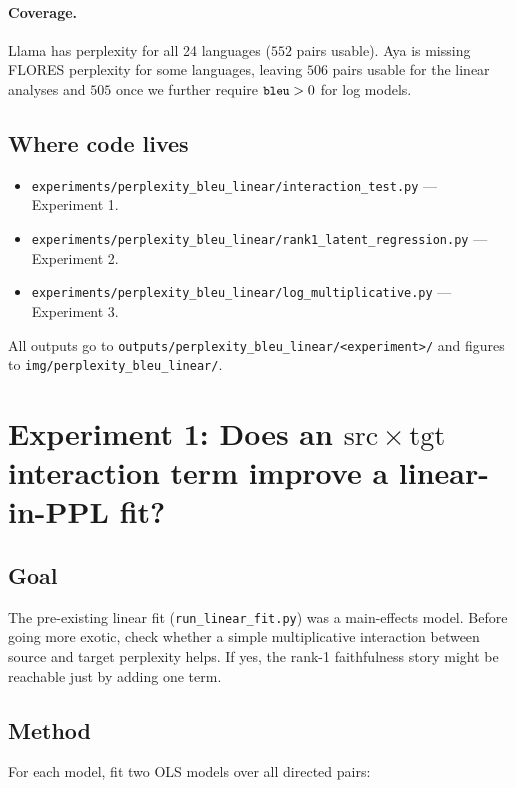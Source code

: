 \documentclass[11pt]{article}
\newcommand{\code}[1]{\texttt{\small #1}}
\begin{document}
\paragraph{Coverage.} Llama has perplexity for all 24 languages
($552$ pairs usable). Aya is missing FLORES perplexity for some languages,
leaving $506$ pairs usable for the linear analyses and $505$ once we further
require $\code{bleu} > 0$ for log models.

\subsection{Where code lives}

\begin{itemize}
  \item \code{experiments/perplexity\_bleu\_linear/interaction\_test.py} ---
    Experiment 1.
  \item \code{experiments/perplexity\_bleu\_linear/rank1\_latent\_regression.py} ---
    Experiment 2.
  \item \code{experiments/perplexity\_bleu\_linear/log\_multiplicative.py} ---
    Experiment 3.
\end{itemize}

All outputs go to \code{outputs/perplexity\_bleu\_linear/<experiment>/} and
figures to \code{img/perplexity\_bleu\_linear/}.

\section{Experiment 1: Does an $\mathrm{src} \times \mathrm{tgt}$ interaction term improve a linear-in-PPL fit?}

\subsection{Goal}

The pre-existing linear fit (\code{run\_linear\_fit.py}) was a main-effects
model. Before going more exotic, check whether a simple multiplicative
interaction between source and target perplexity helps. If yes, the rank-1
faithfulness story might be reachable just by adding one term.

\subsection{Method}

For each model, fit two OLS models over all directed pairs:
\end{document}
